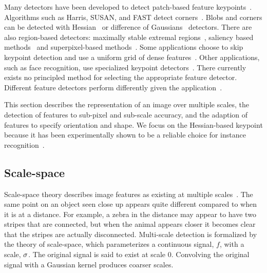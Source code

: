     Many detectors have been developed to detect patch-based feature keypoints~\cite{mikolajczyk_comparison_2005,
    tuytelaars_local_2007}. Algorithms such as Harris, SUSAN, and FAST detect corners~\cite{harris_combined_1988,
    mikolajczyk_indexing_2001, smith_susannew_1997, rosten_machine_2006}. Blobs and corners can be detected with
    Hessian~\cite{beaudet_rotationally_1978, lindeberg_shape_adapted_1994} or difference of
    Gaussians~\cite{gaussier_neural_1992, lowe_distinctive_2004} detectors. There are also region-based detectors:
    maximally stable extremal regions~\cite{matas_robust_2004}, saliency based
    methods~\cite{buoncompagni_saliency_based_2015} and superpixel-based methods~\cite{ren_learning_2003,
    mori_recovering_2004}. Some applications choose to skip keypoint detection and use a uniform grid of dense
    features~\cite{liu_sift_2008, revaud_deep_2015, iscen_comparison_2015}. Other applications, such as face
    recognition, use specialized keypoint detectors~\cite{dantone_real_time_2012, berg_tom_vs_pete_2012}. There
    currently exists no principled method for selecting the appropriate feature detector. Different feature
    detectors perform differently given the application~\cite{tuytelaars_local_2007}.

    This section describes the representation of an image over multiple scales, the detection of features to
    sub-pixel and sub-scale accuracy, and the adaption of features to specify orientation and shape. We focus on
    the Hessian-based keypoint because it has been experimentally shown to be a reliable choice for instance
    recognition~\cite{tuytelaars_local_2007}.

   \subsection{Scale-space}
        Scale-space theory describes image features as existing at multiple
        scales~\cite{lindeberg_scale_space_1993}. The same point on an object seen close up appears quite different
        compared to when it is at a distance. For example, a zebra in the distance may appear to have two stripes
        that are connected, but when the animal appears closer it becomes clear that the stripes are actually
        disconnected.
        Multi-scale detection is formalized by the theory of scale-space, which parameterizes a continuous signal,
        $f$, with a scale, $\sigma$. The original signal is said to exist at scale $0$. Convolving the original
        signal with a Gaussian kernel produces coarser scales.

